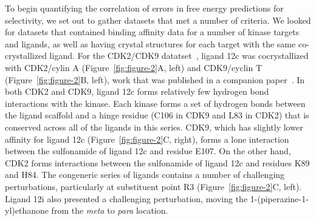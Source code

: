 \documentclass[phd,tocprelim]{cornell}
\begin{document}
To begin quantifying the correlation of errors in free energy predictions for selectivity, we set out to gather datasets that met a number of criteria. We looked for datasets that contained binding affinity data for a number of kinase targets and ligands, as well as having crystal structures for each target with the same co-crystallized ligand. For the CDK2/CDK9 datatset~\citep{Shao2013-oe}, ligand 12c was cocrystallized with CDK2/cylin A (Figure~\ref{fig:figure-2}A, left) and CDK9/cyclin T (Figure~\ref{fig:figure-2}B, left), work that was published in a companion paper~\citep{Hole2013-sr}. In both CDK2 and CDK9, ligand 12c forms relatively few hydrogen bond interactions with the kinase. Each kinase forms a set of hydrogen bonds between the ligand scaffold and a hinge residue (C106 in CDK9 and L83 in CDK2) that is conserved across all of the ligands in this series. CDK9, which has slightly lower affinity for ligand 12c (Figure~\ref{fig:figure-2}C, right), forms a lone interaction between the sulfonamide of ligand 12c and residue E107. On the other hand, CDK2 forms interactions between the sulfonamide of ligand 12c and residues K89 and H84. The congeneric series of ligands contains a number of challenging perturbations, particularly at substituent point R3 (Figure~\ref{fig:figure-2}C, left). Ligand 12i also presented a challenging perturbation, moving the 1-(piperazine-1-yl)ethanone from the \emph{meta} to \emph{para} location. 
\end{document}
